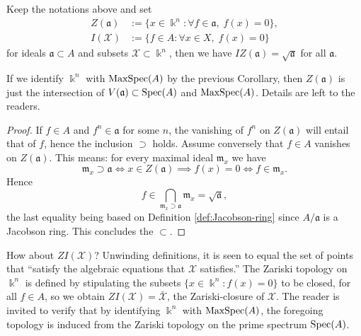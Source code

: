 \begin{corollary}
	Keep the notations above and set
	\begin{align*}
		Z(\mathfrak{a}) & := \{x \in \Bbbk^n: \forall f \in \mathfrak{a}, \; f(x)=0 \}, \\
		I(\mathcal{X}) & := \{f \in A: \forall x \in X, \; f(x)=0 \}
	\end{align*}
	for ideals $\mathfrak{a} \subset A$ and subsets $\mathcal{X} \subset \Bbbk^n$, then we have $IZ(\mathfrak{a}) = \sqrt{\mathfrak{a}}$ for all $\mathfrak{a}$.		
\end{corollary}
If we identify $\Bbbk^n$ with $\operatorname{MaxSpec}(A)$ by the previous Corollary, then $Z(\mathfrak{a})$ is just the intersection of $V(\mathfrak{a}) \subset \operatorname{Spec}(A)$ and $\operatorname{MaxSpec}(A)$. Details are left to the readers.
\begin{proof}
	If $f \in A$ and $f^n \in \mathfrak{a}$ for some $n$, the vanishing of $f^n$ on $Z(\mathfrak{a})$ will entail that of $f$, hence the inclusion $\supset$ holds. Assume conversely that $f \in A$ vanishes on $Z(\mathfrak{a})$. This means: for every maximal ideal $\mathfrak{m}_x$ we have
	\[ \mathfrak{m}_x \supset \mathfrak{a} \iff x \in Z(\mathfrak{a}) \implies f(x)=0 \iff f \in \mathfrak{m}_x. \]
	Hence
	\[ f \in \bigcap_{\mathfrak{m}_x \supset \mathfrak{a}} \mathfrak{m}_x = \sqrt{\mathfrak{a}}, \]
	the last equality being based on Definition \ref{def:Jacobson-ring} since $A/\mathfrak{a}$ is a Jacobson ring. This concludes the $\subset$.
\end{proof}

\begin{remark}
	How about $Z I(\mathcal{X})$? Unwinding definitions, it is seen to equal the set of points that ``satisfy the algebraic equations that $\mathcal{X}$ satisfies.'' The Zariski topology on $\Bbbk^n$ is defined by stipulating the subsets $\{ x \in \Bbbk^n: f(x)=0 \}$ to be closed, for all $f \in A$, so we obtain $ZI(\mathcal{X}) = \bar{\mathcal{X}}$, the Zariski-closure of $\mathcal{X}$. The reader is invited to verify that by identifying $\Bbbk^n$ with $\operatorname{MaxSpec}(A)$, the foregoing topology is induced from the Zariski topology on the prime spectrum $\operatorname{Spec}(A)$.
\end{remark}

